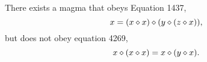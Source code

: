 %
%
%



\begin{theorem}[1437 example]\label{1437-thm}  There exists a magma that obeys Equation 1437,
  $$ x = (x \diamond x) \diamond (y \diamond (z \diamond x)),$$
but does not obey equation 4269,
$$ x \diamond (x \diamond x) = x \diamond (y \diamond x).$$
\end{theorem}

